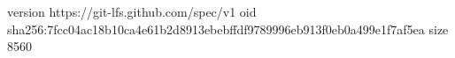 version https://git-lfs.github.com/spec/v1
oid sha256:7fcc04ac18b10ca4e61b2d8913ebebffdf9789996eb913f0eb0a499e1f7af5ea
size 8560
